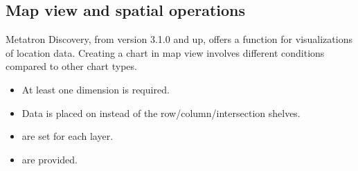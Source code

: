 \documentclass[letterpaper,10pt,english]{sphinxmanual}
\begin{document}
\subsection{Map view and spatial operations}
\label{\detokenize{discovery/part04/map_chart:id1}}\label{\detokenize{discovery/part04/map_chart::doc}}
Metatron Discovery, from version 3.1.0 and up, offers a  function for visualizations of location data. Creating a chart in map view involves different conditions compared to other chart types.
\begin{quote}

\begin{figure}[H]
\centering

\noindent{}
\end{figure}
\end{quote}
\begin{itemize}
\item {} 
At least one  dimension is required.

\item {} 
Data is placed on  instead of the row/column/intersection shelves.

\item {} 
 are set for each layer.

\item {} 
 are provided.

\end{itemize}
\end{document}
